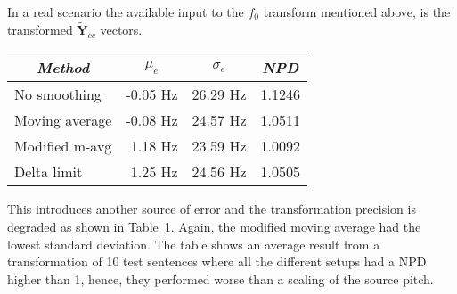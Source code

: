 In a real scenario the available input to the $f_0$ transform mentioned above, is the transformed $\mathbf{\tilde{Y}}_{cc}$ vectors. 
\begin{table}[htbp]
	\begin{center}
		\label{tab:pitch_pred_transformed_input}	
		\begin{tabular}{lrrr}
			\toprule
			\multicolumn{1}{c}{\emph{Method}} & \multicolumn{1}{c}{$\mu_e$} & \multicolumn{1}{c}{$\sigma_e$} & \multicolumn{1}{c}{\emph{NPD}} \\
			\midrule
			No smoothing & -0.05 Hz  & 26.29 Hz & 1.1246\\
			Moving average & -0.08 Hz  & 24.57 Hz & 1.0511\\
			Modified m-avg & 1.18 Hz & 23.59 Hz & 1.0092\\
			Delta limit & 1.25 Hz & 24.56 Hz & 1.0505 \\
			\bottomrule			
		\end{tabular}		
	\end{center}
\end{table}
This introduces another source of error and the transformation precision is degraded as shown in Table~\ref{tab:pitch_pred_transformed_input}. Again, the modified moving average had the lowest standard deviation. The table shows an average result from a transformation of 10 test sentences where all the different setups had a NPD higher than 1, hence, they performed worse than a scaling of the source pitch.

